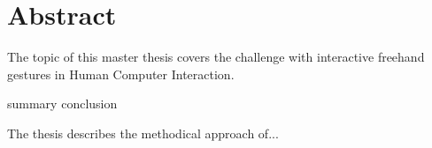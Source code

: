 \chapter*{Abstract}
The topic of this master thesis covers the challenge with interactive freehand gestures in Human Computer Interaction.

summary
conclusion


The thesis describes the methodical approach of...




\hypersetup{pageanchor=false}